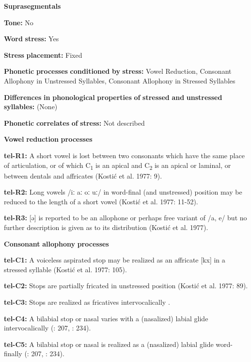 \textbf{Suprasegmentals}

\textbf{Tone:} No

\textbf{Word} \textbf{stress:} Yes

\textbf{Stress} \textbf{placement:} Fixed

\textbf{Phonetic} \textbf{processes} \textbf{conditioned} \textbf{by} \textbf{stress:} Vowel Reduction, Consonant Allophony in Unstressed Syllables, Consonant Allophony in Stressed Syllables

\textbf{Differences} \textbf{in} \textbf{phonological} \textbf{properties} \textbf{of} \textbf{stressed} \textbf{and} \textbf{unstressed} \textbf{syllables:} (None)

\textbf{Phonetic} \textbf{correlates} \textbf{of} \textbf{stress:} Not described

\textbf{Vowel} \textbf{reduction} \textbf{processes}

\textbf{tel-R1:} A short vowel is lost between two consonants which have the same place of articulation, or of which C\textsubscript{1} is an apical and C\textsubscript{2} is an apical or laminal, or between dentals and affricates (Kostić et al. 1977: 9).

\textbf{tel-R2:} Long vowels /iː aː oː uː/ in word-final (and unstressed) position may be reduced to the length of a short vowel (Kostić et al. 1977: 11-52).

\textbf{tel-R3:} [ə] is reported to be an allophone or perhaps free variant of /a, e/ but no further description is given as to its distribution (Kostić et al. 1977).

\textbf{Consonant} \textbf{allophony} \textbf{processes}

\textbf{tel-C1:} A voiceless aspirated stop may be realized as an affricate [kx] in a stressed syllable (Kostić et al. 1977: 105).

\textbf{tel-C2:} Stops are partially fricated in unstressed position (Kostić et al. 1977: 89).

\textbf{tel-C3:} Stops are realized as fricatives intervocalically \citep[207]{Krishnamurti1998}.

\textbf{tel-C4:} A bilabial stop or nasal varies with a (nasalized) labial glide intervocalically (\citealt{Krishnamurti1998}: 207, \citealt{BhaskararaoRay2017}: 234).

\textbf{tel-C5:} A bilabial stop or nasal is realized as a (nasalized) labial glide word-finally (\citealt{Krishnamurti1998}: 207, \citealt{BhaskararaoRay2017}: 234).

